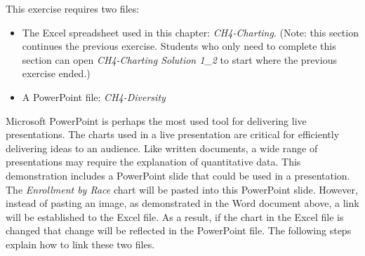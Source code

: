 This exercise requires two files:

\begin{itemize}
	\item The Excel spreadsheet used in this chapter: \textit{CH4-Charting}. (Note: this section continues the previous exercise. Students who only need to complete this section can open \textit{CH4-Charting Solution 1\_2} to start where the previous exercise ended.)
	
	\item A PowerPoint file: \textit{CH4-Diversity}
\end{itemize}

Microsoft PowerPoint is perhaps the most used tool for delivering live presentations. The charts used in a live presentation are critical for efficiently delivering ideas to an audience. Like written documents, a wide range of presentations may require the explanation of quantitative data. This demonstration includes a PowerPoint slide that could be used in a presentation. The \textit{Enrollment by Race} chart will be pasted into this PowerPoint slide. However, instead of pasting an image, as demonstrated in the Word document above, a link will be established to the Excel file. As a result, if the chart in the Excel file is changed that change will be reflected in the PowerPoint file. The following steps explain how to link these two files.

